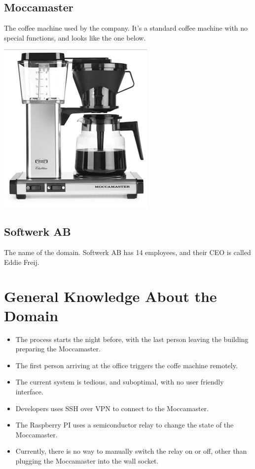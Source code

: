 \subsection{Moccamaster}

The coffee machine used by the company. It's a standard coffee machine with no special functions, and looks like the one below.

\vspace{10mm}

\begin{center}
\includegraphics[scale=0.45]{moccamaster}
\end{center}

\subsection{Softwerk AB}

The name of the domain. Softwerk AB has 14 employees, and their CEO is called Eddie Freij.


\section{General Knowledge About the Domain}

\begin{itemize}

\item The process starts the night before, with the last person leaving the building preparing the Moccamaster.
\item The first person arriving at the office triggers the coffe machine remotely.
\item The current system is tedious, and suboptimal, with no user friendly interface.
\item Developers uses SSH over VPN to connect to the Moccamaster.
\item The Raspberry PI uses a semiconductor relay to change the state of the Moccamaster.
\item Currently, there is no way to manually switch the relay on or off, other than plugging the Moccamaster into the wall socket.

\end{itemize}

